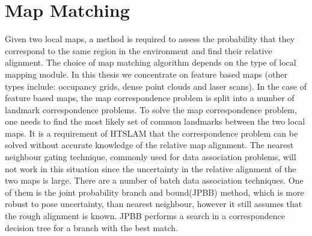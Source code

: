\section{Map Matching}
\label{sec:map_matching}


Given two local maps, a method is required to assess the probability
that they correspond to the same region in the environment and find
their relative alignment. The choice of map matching algorithm depends
on the type of local mapping module. In this thesis we concentrate on
feature based maps (other types include: occupancy grids, dense point
clouds and laser scans). In the case of feature based maps, the map
correspondence problem is split into a number of landmark
correspondence problems. To solve the map correspondence problem, one
needs to find the most likely set of common landmarks between the two
local maps. It is a requirement of HTSLAM that the correspondence
problem can be solved without accurate knowledge of the relative map
alignment. The nearest neighbour gating technique, commonly used for
data association problems, will not work in this situation since the
uncertainty in the relative alignment of the two maps is large. There
are a number of batch data association techniques. One of them is the
joint probability branch and bound(JPBB)
\cite{neira01:_data_assoc_stoch_mappin_using} method, which is more
robust to pose uncertainty, than nearest neighbour, however it still
assumes that the rough alignment is known. JPBB performs a search in a
correspondence decision tree for a branch with the best match.

